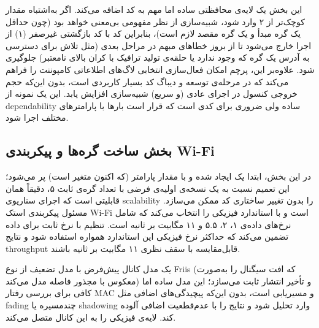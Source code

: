 \documentclass{article}
\begin{document}
	\lr{}
	
	این بخش یک لایه‌ی محافظتی ساده اما مهم به کد اضافه می‌کند. اگر به‌اشتباه مقدار  کوچک‌تر از ۲ وارد شود، شبیه‌سازی از نظر مفهومی بی‌معنی خواهد بود (چون حداقل یک گره مبدأ و یک گره مقصد لازم است)، بنابراین کد با کد بازگشتی غیرصفر (۱) از اجرا خارج می‌شود تا از بروز خطاهای مبهم در مراحل بعدی (مثل تلاش برای دسترسی به آدرس یک گره که وجود ندارد یا حلقه‌ی تولید ترافیک با کران بالای نامعتبر) جلوگیری شود. علاوه‌بر این، پرچم  امکان فعال‌سازی انتخابی لاگ‌های اطلاعاتی کامپوننت  را فراهم می‌کند که در مرحله‌ی توسعه و دیباگ کد بسیار کاربردی است، بدون این‌که حجم خروجی کنسول در اجرای عادی (و سریع) شبیه‌سازی افزایش یابد. این یک نمونه از dependability ساده ولی ضروری برای کدی است که قرار است بارها با پارامترهای مختلف اجرا شود.
	
	\subsection{بخش ساخت گره‌ها و پیکربندی Wi-Fi}
	
	\lr{}
	
	در این بخش، ابتدا یک  ایجاد شده و با مقدار پارامتر  (که اکنون متغیر است) پر می‌شود؛ این تعمیم نسبت به یک نسخه‌ی اولیه‌ی فرضی با تعداد گره‌ی ثابت ۵، دقیقاً همان قابلیتی است که اجرای سناریوی scalability را بدون تغییر ساختاری کد ممکن می‌سازد.  مسئول پیکربندی استک Wi-Fi است و با
	استاندارد فیزیکی  را انتخاب می‌کند که شامل نرخ‌های داده‌ی ۱، ۲، ۵.۵ و ۱۱ مگابیت بر ثانیه است. تنظیم  با نرخ ثابت  برای داده تضمین می‌کند که حداکثر نرخ فیزیکی این استاندارد همواره استفاده شود و نتایج throughput قابل‌مقایسه با سقف نظری ۱۱ مگابیت بر ثانیه باشند.
	
	 یک مدل کانال پیش‌فرض با مدل تضعیف 
	 از نوع Friis (که افت سیگنال را به‌صورت معکوس با مجذور فاصله مدل می‌کند) و تأخیر انتشار ثابت می‌سازد؛ این مدل ساده اما کافی برای بررسی رفتار MAC و مسیریابی است، بدون این‌که پیچیدگی‌های اضافی مثل fading چندمسیره یا shadowing وارد تحلیل شود و نتایج را با عدم‌قطعیت اضافی آلوده کند.  لایه‌ی فیزیکی را به این کانال متصل می‌کند.
	
\end{document}
